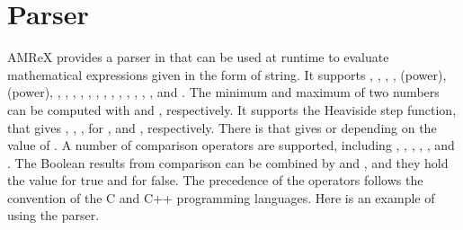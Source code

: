 \documentclass[letterpaper,10pt,english]{sphinxmanual}
\begin{document}
\section{Parser}
\label{\detokenize{Basics:parser}}\label{\detokenize{Basics:sec-basics-parser}}
\sphinxAtStartPar
AMReX provides a parser in  that can be used at runtime to evaluate mathematical
expressions given in the form of string.  It supports \sphinxcode{\sphinxupquote{+}}, \sphinxcode{\sphinxupquote{\sphinxhyphen{}}}, \sphinxcode{\sphinxupquote{*}},
\sphinxcode{\sphinxupquote{/}}, \sphinxcode{\sphinxupquote{**}} (power), \sphinxcode{\sphinxupquote{\textasciicircum{}}} (power), , , , ,
, , , , , , , ,
, and .  The minimum and maximum of two numbers can be
computed with  and , respectively.  It supports the Heaviside
step function,  that gives , , , for
,  and , respectively.  There is 
that gives  or  depending on the value of .  A number of
comparison operators are supported, including \sphinxcode{\sphinxupquote{\textless{}}}, \sphinxcode{\sphinxupquote{\textgreater{}}}, \sphinxcode{\sphinxupquote{==}}, \sphinxcode{\sphinxupquote{!=}},
\sphinxcode{\sphinxupquote{\textless{}=}}, and \sphinxcode{\sphinxupquote{\textgreater{}=}}.  The Boolean results from comparison can be combined by
 and , and they hold the value  for true and  for
false.  The precedence of the operators follows the convention of the C and
C++ programming languages.  Here is an example of using the parser.
\end{document}
